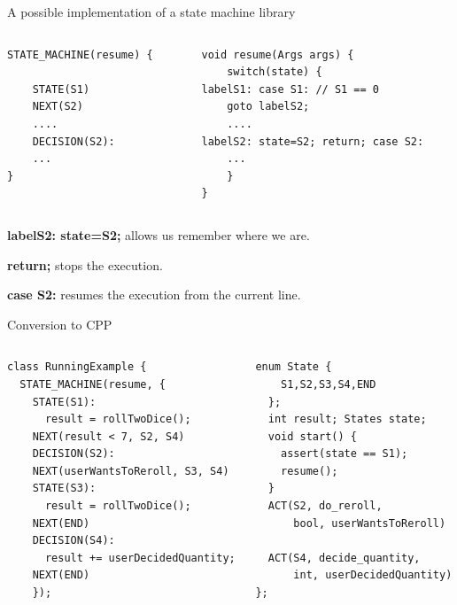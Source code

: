 \documentclass[aspectratio=169,11pt]{beamer}
\begin{document}
\begin{frame}{A possible implementation of a state machine library}

  \begin{columns}[T,onlytextwidth]
\begin{column}{0.50\textwidth}
\begin{lstlisting}[style=cppstyle, numbers=none]
STATE_MACHINE(resume) {

    STATE(S1)
    NEXT(S2)
    ....
    DECISION(S2):
    ...
}
\end{lstlisting}

\end{column}
\begin{column}{0.48\textwidth}
\begin{lstlisting}[style=cppstyle, numbers=none]
void resume(Args args) {
    switch(state) {
labelS1: case S1: // S1 == 0
    goto labelS2;
    ....
labelS2: state=S2; return; case S2:
    ...
    }
}
\end{lstlisting}
\end{column}
\end{columns}
\textbf{labelS2: state=S2;} allows us remember where we are.

\textbf{return;} stops the execution. 

\textbf{case S2:} resumes the execution from the current line.
\end{frame}



\begin{frame}{Conversion to CPP}

  \begin{columns}[T,onlytextwidth]
\begin{column}{0.52\textwidth}
\begin{lstlisting}[style=cppstyle, numbers=none]
class RunningExample {
  STATE_MACHINE(resume, {
    STATE(S1):
      result = rollTwoDice();
    NEXT(result < 7, S2, S4)
    DECISION(S2):
    NEXT(userWantsToReroll, S3, S4)
    STATE(S3):
      result = rollTwoDice();
    NEXT(END)
    DECISION(S4):
      result += userDecidedQuantity;
    NEXT(END)
    });
\end{lstlisting}

\end{column}
\begin{column}{0.45\textwidth}
\begin{lstlisting}[style=cppstyle, numbers=none]
  enum State {
    S1,S2,S3,S4,END
  };
  int result; States state; 
  void start() {
    assert(state == S1);
    resume();
  }
  ACT(S2, do_reroll, 
      bool, userWantsToReroll)

  ACT(S4, decide_quantity, 
      int, userDecidedQuantity)
};
\end{lstlisting}
\end{column}
\end{columns}
\end{frame}
\end{document}
